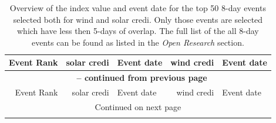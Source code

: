 \documentclass[a4paper,11pt]{extarticle}
\newcommand{\sdi}[0]{{\sc solar credi}}
\newcommand{\wdi}[0]{{\sc wind credi}}
\begin{document}
\clearpage
\begin{longtable}{|r|rl|rl|}
\caption{
    Overview of the index value and event date for the top 50 8-day events selected both for {\sc wind} and \sdi{}. 
    Only those events are selected which have less then 5-days of overlap. 
    The full list of the all 8-day events can be found as listed in the \emph{Open Research} section.} \label{tab:Top50longtable} \\

\hline 
Event Rank & \sdi{} & Event date & \wdi{} & Event date  \\ \hline \hline
\endfirsthead

\multicolumn{5}{c}{{\bfseries \tablename\ \thetable{} -- continued from previous page}} \\ \hline
Event Rank & \sdi{} & Event date & \wdi{} & Event date  \\ \hline \hline
\endhead

\hline \multicolumn{5}{|c|}{{Continued on next page}} \\ \hline
\endfoot

\hline \hline
\endlastfoot


\end{longtable}
\end{document}
